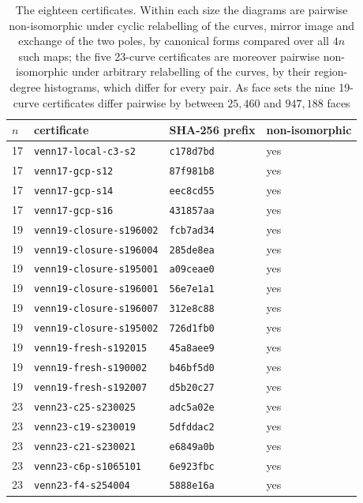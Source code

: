 \documentclass[11pt]{article}
\begin{document}
\begin{table}[h]
\centering\small
\begin{tabular}{llll}
\toprule
$n$ & certificate & SHA-256 prefix & non-isomorphic \\
\midrule
17 & \texttt{venn17-local-c3-s2} & \texttt{c178d7bd} & yes \\
17 & \texttt{venn17-gcp-s12} & \texttt{87f981b8} & yes \\
17 & \texttt{venn17-gcp-s14} & \texttt{eec8cd55} & yes \\
17 & \texttt{venn17-gcp-s16} & \texttt{431857aa} & yes \\
19 & \texttt{venn19-closure-s196002} & \texttt{fcb7ad34} & yes \\
19 & \texttt{venn19-closure-s196004} & \texttt{285de8ea} & yes \\
19 & \texttt{venn19-closure-s195001} & \texttt{a09ceae0} & yes \\
19 & \texttt{venn19-closure-s196001} & \texttt{56e7e1a1} & yes \\
19 & \texttt{venn19-closure-s196007} & \texttt{312e8c88} & yes \\
19 & \texttt{venn19-closure-s195002} & \texttt{726d1fb0} & yes \\
19 & \texttt{venn19-fresh-s192015} & \texttt{45a8aee9} & yes \\
19 & \texttt{venn19-fresh-s190002} & \texttt{b46bf5d0} & yes \\
19 & \texttt{venn19-fresh-s192007} & \texttt{d5b20c27} & yes \\
23 & \texttt{venn23-c25-s230025} & \texttt{adc5a02e} & yes \\
23 & \texttt{venn23-c19-s230019} & \texttt{5dfddac2} & yes \\
23 & \texttt{venn23-c21-s230021} & \texttt{e6849a0b} & yes \\
23 & \texttt{venn23-c6p-s1065101} & \texttt{6e923fbc} & yes \\
23 & \texttt{venn23-f4-s254004} & \texttt{5888e16a} & yes \\
\bottomrule
\end{tabular}
\caption{The eighteen certificates. Within each size the diagrams are pairwise non-isomorphic under cyclic
relabelling of the curves, mirror image and exchange of the two poles, by canonical forms compared over all $4n$ such
maps; the five 23-curve certificates are moreover pairwise non-isomorphic under arbitrary relabelling of the curves,
by their region-degree histograms, which differ for every pair. As face sets
the nine 19-curve certificates differ pairwise by between $25{,}460$ and $947{,}188$ faces
}
\end{table}
\end{document}
